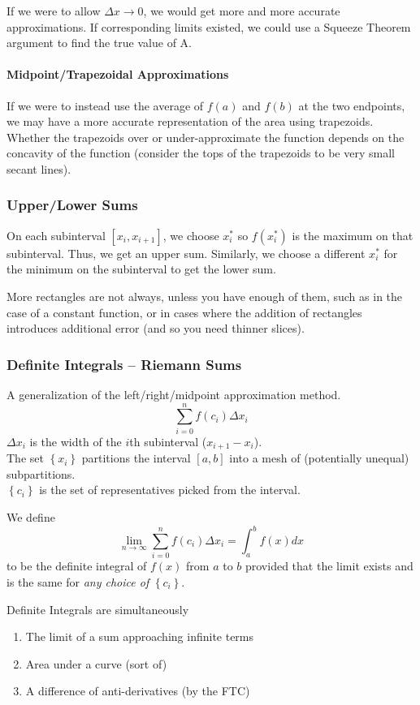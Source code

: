 \documentclass{article}
\begin{document}
If we were to allow $\Delta x \to 0$, we would get more and more accurate approximations. If corresponding limits existed, we could use a Squeeze Theorem argument to find the true value of A.

\paragraph{Midpoint/Trapezoidal Approximations}
If we were to instead use the average of $f(a)$ and $f(b)$ at the two endpoints, we may have a more accurate representation of the area using trapezoids. Whether the trapezoids over or under-approximate the function depends on the concavity of the function (consider the tops of the trapezoids to be very small secant lines).

\subsubsection{Upper/Lower Sums}
On each subinterval $[x_i, x_{i+1}]$, we choose $x_i^*$ so $f(x_i^*)$ is the maximum on that subinterval. Thus, we get an upper sum. Similarly, we choose a different $x_i^*$ for the minimum on the subinterval to get the lower sum.

More rectangles are not always, unless you have enough of them, such as in the case of a constant function, or in cases where the addition of rectangles introduces additional error (and so you need thinner slices).

\subsubsection{Definite Integrals -- Riemann Sums} A generalization of the left/right/midpoint approximation method.
$$\sum_{i=0}^{n}f(c_i)\Delta x_i$$
$\Delta x_i$ is the width of the $i$th subinterval ($x_{i+1} - x_i$).\\The set $\left\{x_i\right\}$ partitions the interval $[a,b]$ into a mesh of (potentially unequal) subpartitions.\\
$\left\{c_i\right\}$ is the set of representatives picked from the interval.

We define
$$\lim_{n\to\infty}\sum_{i=0}^{n}f(c_i)\Delta x_i = \int_a^b f(x)dx$$ to be the definite integral of $f(x)$ from $a$ to $b$ provided that the limit exists and is the same for \emph{any choice of} $\left\{c_i\right\}$.

Definite Integrals are simultaneously
\begin{enumerate}
    \item The limit of a sum approaching infinite terms
    \item Area under a curve (sort of)
    \item A difference of anti-derivatives (by the FTC)
\end{enumerate}
\end{document}
